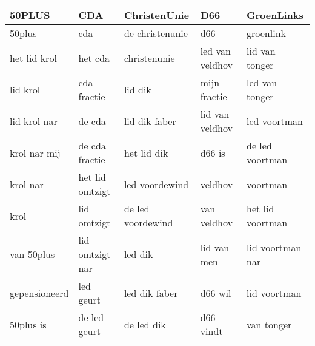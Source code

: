 \begin{tabular}{lllll}
\toprule
        50PLUS &              CDA &       ChristenUnie &              D66 &        GroenLinks \\
\midrule
        50plus &              cda &    de christenunie &              d66 &         groenlink \\
  het lid krol &          het cda &       christenunie &  led van veldhov &    lid van tonger \\
      lid krol &      cda fractie &            lid dik &     mijn fractie &    led van tonger \\
  lid krol nar &           de cda &      lid dik faber &  lid van veldhov &      led voortman \\
  krol nar mij &   de cda fractie &        het lid dik &           d66 is &   de led voortman \\
      krol nar &  het lid omtzigt &     led voordewind &          veldhov &          voortman \\
          krol &      lid omtzigt &  de led voordewind &      van veldhov &  het lid voortman \\
    van 50plus &  lid omtzigt nar &            led dik &      lid van men &  lid voortman nar \\
 gepensioneerd &        led geurt &      led dik faber &          d66 wil &      lid voortman \\
     50plus is &     de led geurt &         de led dik &        d66 vindt &        van tonger \\
\bottomrule
\end{tabular}
